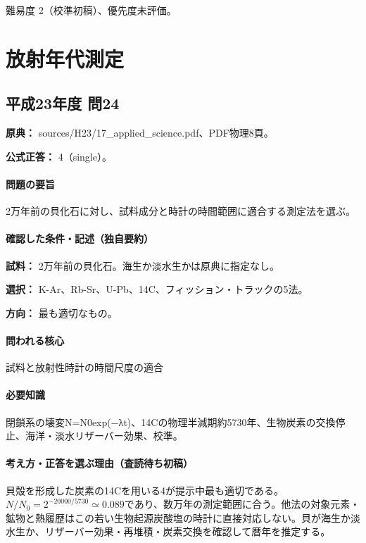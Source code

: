 \par 難易度 2（校準初稿）、優先度未評価。

\section{放射年代測定}

\subsection{平成23年度 問24}
\label{q:h23-reg-applied-24}

\noindent\textbf{原典：} sources/H23/17\_applied\_science.pdf、PDF物理8頁。

\textbf{公式正答：} 4（single）。

\paragraph{問題の要旨} 2万年前の貝化石に対し、試料成分と時計の時間範囲に適合する測定法を選ぶ。

\paragraph{確認した条件・記述（独自要約）}\mbox{}\par

\noindent\textbf{試料：} 2万年前の貝化石。海生か淡水生かは原典に指定なし。\par

\noindent\textbf{選択：} K-Ar、Rb-Sr、U-Pb、14C、フィッション・トラックの5法。\par

\noindent\textbf{方向：} 最も適切なもの。\par

\paragraph{問われる核心} 試料と放射性時計の時間尺度の適合

\paragraph{必要知識} 閉鎖系の壊変N=\allowbreak{}N0exp(−λt)、14Cの物理半減期約5730年、生物炭素の交換停止、海洋・淡水リザーバー効果、校準。

\paragraph{考え方・正答を選ぶ理由（査読待ち初稿）} 貝殻を形成した炭素の14Cを用いる4が提示中最も適切である。\(N/N_0=2^{-20000/5730}\simeq0.089\)であり、数万年の測定範囲に合う。他法の対象元素・鉱物と熱履歴はこの若い生物起源炭酸塩の時計に直接対応しない。貝が海生か淡水生か、リザーバー効果・再堆積・炭素交換を確認して暦年を推定する。

